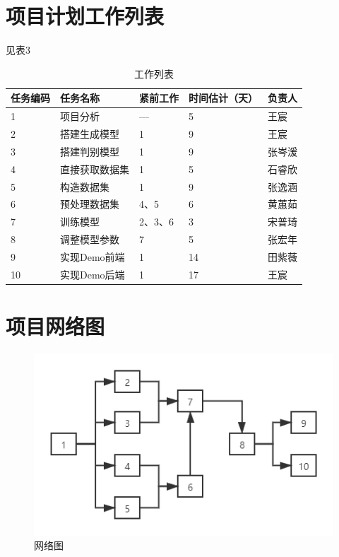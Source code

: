 \documentclass[
  hyperref, a4paper]{ctexart}
\begin{document}
\hypertarget{ux9879ux76eeux8ba1ux5212ux5de5ux4f5cux5217ux8868}{%
\section{项目计划工作列表}\label{ux9879ux76eeux8ba1ux5212ux5de5ux4f5cux5217ux8868}}

见表3

\begin{table}
    \caption{工作列表}
    \begin{tabular}{|p{2.0cm}<{\centering}|p{2.0cm}<{\centering}|p{2.0cm}<{\centering}|p{2.0cm}<{\centering}|p{2.0cm}<{\centering}|}
    \hline
    任务编码 & 任务名称     & 紧前工作  & 时间估计（天） & 负责人 \\ \hline
    1    & 项目分析     & —     & 5       & 王宸  \\ \hline
    2    & 搭建生成模型   & 1     & 9       & 王宸  \\ \hline
    3    & 搭建判别模型   & 1     & 9       & 张岑湲 \\ \hline
    4    & 直接获取数据集  & 1     & 5       & 石睿欣 \\ \hline
    5    & 构造数据集    & 1     & 9       & 张逸涵 \\ \hline
    6    & 预处理数据集   & 4、5   & 6       & 黄蕙茹 \\ \hline
    7    & 训练模型     & 2、3、6 & 3       & 宋普琦 \\ \hline
    8    & 调整模型参数   & 7     & 5       & 张宏年 \\ \hline
    9    & 实现Demo前端 & 1     & 14      & 田紫薇 \\ \hline
    10   & 实现Demo后端 & 1     & 17      & 王宸  \\ \hline
    \end{tabular}
\end{table}

\hypertarget{ux9879ux76eeux7f51ux7edcux56fe}{%
\section{项目网络图}\label{ux9879ux76eeux7f51ux7edcux56fe}}

\begin{figure}
\centering
\includegraphics{2.png}
\caption{网络图}
\end{figure}
\end{document}

